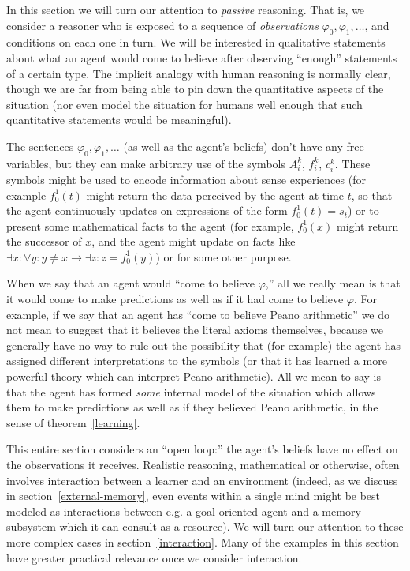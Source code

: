 \documentclass[12pt]{article}
\theoremstyle{definition}
\newcommand{\vp}{\varphi}
\begin{document}
In this section we will turn our attention to \emph{passive} reasoning.
That is, we consider a reasoner who is exposed
to a sequence of \emph{observations}
$\vp_0, \vp_1, \ldots$,
and conditions on each one in turn.
We will be interested in qualitative statements about what an agent
would come to believe after observing ``enough'' statements of a certain type.
The implicit analogy with human reasoning is normally clear,
though we are far from being able to pin down the quantitative
aspects of the situation (nor even model the situation for humans
well enough that such quantitative statements would be meaningful).

The sentences $\vp_0, \vp_1, \ldots$ (as well as the agent's beliefs)
don't have any free variables, but they can make
arbitrary use of the symbols $A_i^k$, $f_i^k$, $c_i^k$.
These symbols might be used to encode information about
sense experiences (for example $f_0^1(t)$ might return the data
perceived by the agent at time $t$, so that the agent
continuously updates on expressions of the form $f_0^1(t) = s_t$)  or to present some mathematical
facts to the agent (for example, $f_0^1(x)$ might return the successor of $x$,
and the agent might update on facts like $\exists x : \forall y : y \neq x \rightarrow \exists z : z = f_0^1(y)$)
or for some other purpose.

When we say that an agent would ``come to believe $\vp$,''
all we really mean is that it would come to make predictions
as well as if it had come to believe $\vp$. 
For example,
if we say that an agent has ``come to believe Peano arithmetic'' we do not
mean to suggest that it believes the literal axioms themselves, because
we generally have no way to rule out the possibility that (for example) the agent
has assigned different interpretations to the symbols (or that it has learned a more
powerful theory which can interpret Peano arithmetic).
All we mean to say is that the agent has formed \emph{some} internal model
of the situation which allows them to make predictions as well as if they
believed Peano arithmetic, in the sense of theorem~\ref{learning}.

This entire section considers an ``open loop:''
the agent's beliefs have no effect on the observations it receives.
Realistic reasoning, mathematical or otherwise, often involves interaction
between a learner and an environment
(indeed, as we discuss in section~\ref{external-memory}, even events
within a single mind might be best modeled as interactions between e.g.
a goal-oriented agent and a memory subsystem which it can consult as a resource).
We will turn our attention to these more complex cases
in section~\ref{interaction}.
Many of the examples in this section have greater practical relevance
once we consider interaction.
\end{document}
